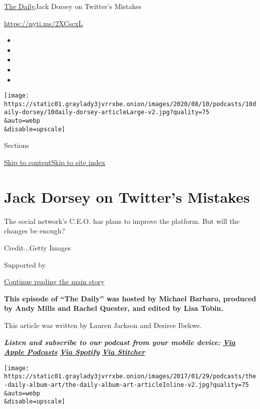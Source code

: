 \href{/podcasts/the-daily}{The Daily}\textbar{}Jack Dorsey on Twitter's
Mistakes

\href{https://nyti.ms/2XCscxL}{https://nyti.ms/2XCscxL}

\begin{itemize}
\item
\item
\item
\item
\item
\end{itemize}

\texttt{[image: https://static01.graylady3jvrrxbe.onion/images/2020/08/10/podcasts/10daily-dorsey/10daily-dorsey-articleLarge-v2.jpg?quality=75\\\&auto=webp\\\&disable=upscale]}

Sections

\protect\hyperlink{site-content}{Skip to
content}\protect\hyperlink{site-index}{Skip to site index}

\hypertarget{jack-dorsey-on-twitters-mistakes}{%
\section{Jack Dorsey on Twitter's
Mistakes}\label{jack-dorsey-on-twitters-mistakes}}

The social network's C.E.O. has plans to improve the platform. But will
the changes be enough?

Credit...Getty Images

Supported by

\protect\hyperlink{after-sponsor}{Continue reading the main story}

\textbf{This episode of ``The Daily'' was hosted by Michael Barbaro,
produced by Andy Mills and Rachel Quester, and edited by Lisa Tobin.}

This article was written by Lauren Jackson and Desiree Ibekwe.

\emph{\textbf{Listen and subscribe to our podcast from your mobile
device:}}
\textbf{\href{https://itunes.apple.com/us/podcast/the-daily/id1200361736?mt=2}{\emph{Via
Apple Podcasts}}} \emph{\textbf{\textbar{}}}
\textbf{\href{https://open.spotify.com/show/3IM0lmZxpFAY7CwMuv9H4g?si=SfuMSC55R1qprFsRZU3_zw}{\emph{Via
Spotify}}} \emph{\textbf{\textbar{}}}
\textbf{\href{http://www.stitcher.com/podcast/the-new-york-times/the-daily-10}{\emph{Via
Stitcher}}}

\texttt{[image: https://static01.graylady3jvrrxbe.onion/images/2017/01/29/podcasts/the-daily-album-art/the-daily-album-art-articleInline-v2.jpg?quality=75\\\&auto=webp\\\&disable=upscale]}

